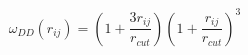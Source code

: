 


$$
 \omega_{DD}\left(r_{ij}\right) = \left(1+\frac{3r_{ij}}{r_{cut}}\right)\left(1+\frac{r_{ij}}{r_{cut}}\right)^3
$$


